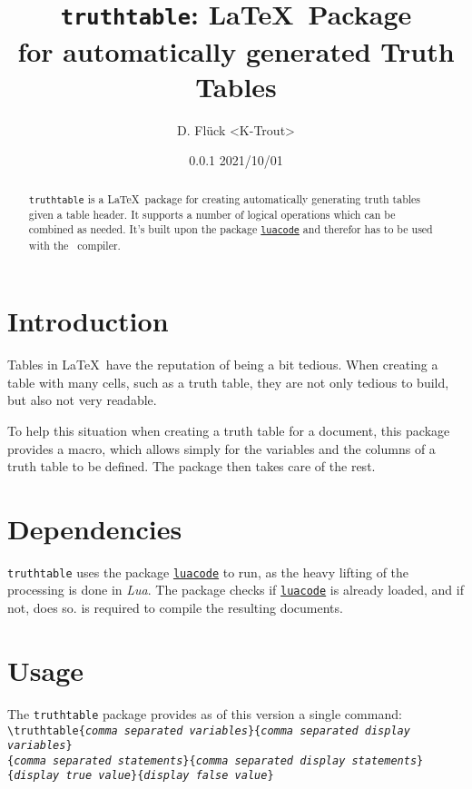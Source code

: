 \documentclass[a4paper]{article}
\title{\texttt{truthtable}\textbf{: \LaTeX\ Package\\for automatically generated Truth Tables}}
\author{D. Flück <K-Trout>}
\date{0.0.1 2021/10/01}
\begin{document}
	\maketitle

	\begin{abstract}
		\noindent \texttt{truthtable} is a \LaTeX\ package for creating automatically generating truth tables given a table header. It supports a number of logical operations which can be combined as needed. It's built upon the package \href{https://ctan.org/pkg/luacode}{\texttt{luacode}} and therefor has to be used with the \LuaLaTeX\ compiler.
	\end{abstract}

	\tableofcontents

	\section{Introduction}
	Tables in \LaTeX\ have the reputation of being a bit tedious. When creating a table with many cells, such as a truth table, they are not only tedious to build, but also not very readable.

	To help this situation when creating a truth table for a document, this package provides a macro, which allows simply for the variables and the columns of a truth table to be defined. The package then takes care of the rest.

	\section{Dependencies}

	\texttt{truthtable} uses the package \href{https://ctan.org/pkg/luacode}{\texttt{luacode}} to run, as the heavy lifting of the processing is done in \emph{Lua}. 	The package checks if \href{https://ctan.org/pkg/luacode}{\texttt{luacode}} is already loaded, and if not, does so. \LuaLaTeX is required to compile the resulting documents.	

	\section{Usage}

	The \texttt{truthtable} package provides as of this version a single command:\\ \texttt{\textbackslash truthtable\{\emph{comma separated variables}\}\{\emph{comma separated display variables}\}\\\{\emph{comma separated statements}\}\{\emph{comma separated display statements}\}\\\{\emph{display true value}\}\{\emph{display false value}\}}
\end{document}
